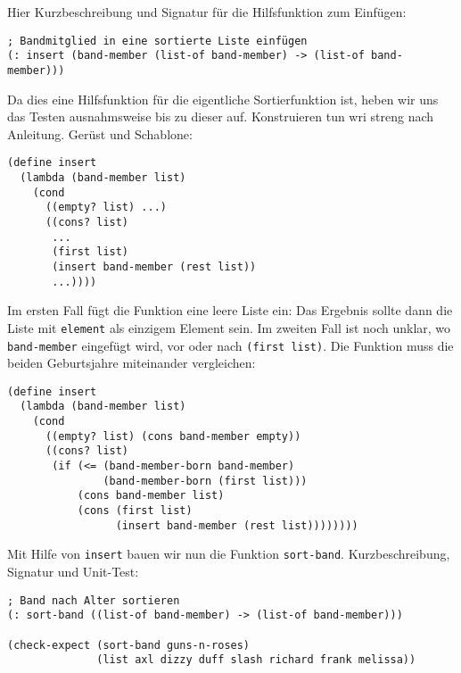 
Hier Kurzbeschreibung und Signatur für die Hilfsfunktion zum Einfügen:
%
\begin{lstlisting}
; Bandmitglied in eine sortierte Liste einfügen
(: insert (band-member (list-of band-member) -> (list-of band-member)))
\end{lstlisting}
%
Da dies eine Hilfsfunktion für die eigentliche Sortierfunktion ist,
heben wir uns das Testen ausnahmsweise bis zu dieser auf.
Konstruieren tun wri streng nach Anleitung.  Gerüst und Schablone:
%
\begin{lstlisting}
(define insert
  (lambda (band-member list)
    (cond
      ((empty? list) ...)
      ((cons? list)
       ...
       (first list)
       (insert band-member (rest list))
       ...))))
\end{lstlisting}
%
Im ersten Fall fügt die Funktion eine leere Liste ein: Das Ergebnis
sollte dann die Liste mit \lstinline{element} als einzigem Element
sein.  Im zweiten Fall ist noch unklar, wo \lstinline{band-member}
eingefügt wird, vor oder nach \lstinline{(first list)}.  Die Funktion
muss die beiden Geburtsjahre miteinander vergleichen:
%
\begin{lstlisting}
(define insert
  (lambda (band-member list)
    (cond
      ((empty? list) (cons band-member empty))
      ((cons? list)
       (if (<= (band-member-born band-member)
               (band-member-born (first list)))
           (cons band-member list)
           (cons (first list)
                 (insert band-member (rest list))))))))
\end{lstlisting}
%
Mit Hilfe von \lstinline{insert} bauen wir nun die Funktion
\lstinline{sort-band}.  Kurzbeschreibung, Signatur und Unit-Test:
%
\begin{lstlisting}
; Band nach Alter sortieren
(: sort-band ((list-of band-member) -> (list-of band-member)))

(check-expect (sort-band guns-n-roses)
              (list axl dizzy duff slash richard frank melissa))
\end{lstlisting}
